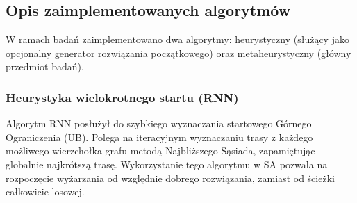 \documentclass[conference]{IEEEtran}
\begin{document}
        \subsection{Opis zaimplementowanych algorytmów}
            W ramach badań zaimplementowano dwa algorytmy: heurystyczny (służący jako opcjonalny generator rozwiązania początkowego) oraz metaheurystyczny (główny przedmiot badań).
            \subsubsection{Heurystyka wielokrotnego startu (RNN)}
                Algorytm RNN posłużył do szybkiego wyznaczania startowego Górnego Ograniczenia (UB). Polega na iteracyjnym wyznaczaniu trasy z każdego możliwego wierzchołka grafu metodą Najbliższego Sąsiada, zapamiętując globalnie najkrótszą trasę. Wykorzystanie tego algorytmu w SA pozwala na rozpoczęcie wyżarzania od względnie dobrego rozwiązania, zamiast od ścieżki całkowicie losowej.
\end{document}
